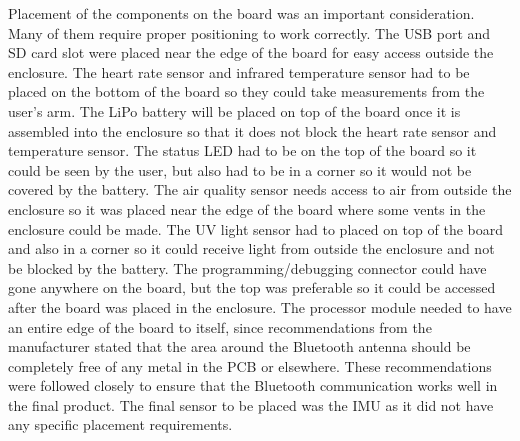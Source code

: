 Placement of the components on the board was an important consideration. Many 
of them require proper positioning to work correctly. The USB port and SD card 
slot were placed near the edge of the board for easy access outside the 
enclosure. The heart rate sensor and infrared temperature sensor had to be 
placed on the bottom of the board so they could take measurements from the 
user’s arm. The LiPo battery will be placed on top of the board once it is 
assembled into the enclosure so that it does not block the heart rate sensor 
and temperature sensor. The status LED had to be on the top of the board so it 
could be seen by the user, but also had to be in a corner so it would not be 
covered by the battery. The air quality sensor needs access to air from outside 
the enclosure so it was placed near the edge of the board where some vents in 
the enclosure could be made. The UV light sensor had to placed on top of the 
board and also in a corner so it could receive light from outside the enclosure 
and not be blocked by the battery. The programming/debugging connector could 
have gone anywhere on the board, but the top was preferable so it could 
be accessed after the board was placed in the enclosure. The processor
module needed to have an entire edge of the board to itself, since 
recommendations from the manufacturer stated that the area around the Bluetooth 
antenna should be completely free of any metal in the PCB or elsewhere. These 
recommendations were followed closely to ensure that the Bluetooth 
communication works well in the final product. The final sensor to be placed 
was the IMU as it did not have any specific placement requirements.
